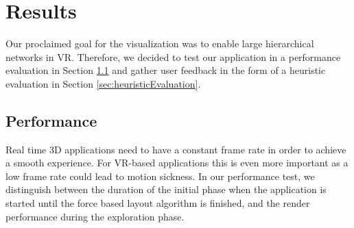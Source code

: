 \chapter{Results}

Our proclaimed goal for the visualization was to enable large hierarchical networks in VR. 
Therefore, we decided to test our application in a performance evaluation in Section \ref{sec:performanceEvaluation} and gather user feedback in the form of a heuristic evaluation in Section \ref{sec:heuristicEvaluation}.

\section{Performance}
\label{sec:performanceEvaluation}

Real time 3D applications need to have a constant frame rate in order to achieve a smooth experience.
For VR-based applications this is even more important as a low frame rate could lead to motion sickness. 
In our performance test, we distinguish between the duration of the initial phase when the application is started until the force based layout algorithm is finished, and the render performance during the exploration phase. 

